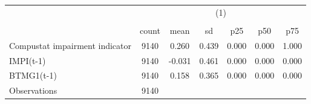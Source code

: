 {
\def\sym#1{\ifmmode^{#1}\else\(^{#1}\)\fi}
\begin{tabular}{l*{1}{cccccc}}
\hline\hline
                    &\multicolumn{6}{c}{(1)}                                                      \\
                    &\multicolumn{6}{c}{}                                                         \\
                    &       count&        mean&          sd&         p25&         p50&         p75\\
\hline
Compustat impairment indicator&        9140&       0.260&       0.439&       0.000&       0.000&       1.000\\
IMPI(t-1)           &        9140&      -0.031&       0.461&       0.000&       0.000&       0.000\\
BTMG1(t-1)          &        9140&       0.158&       0.365&       0.000&       0.000&       0.000\\
\hline
Observations        &        9140&            &            &            &            &            \\
\hline\hline
\end{tabular}
}
